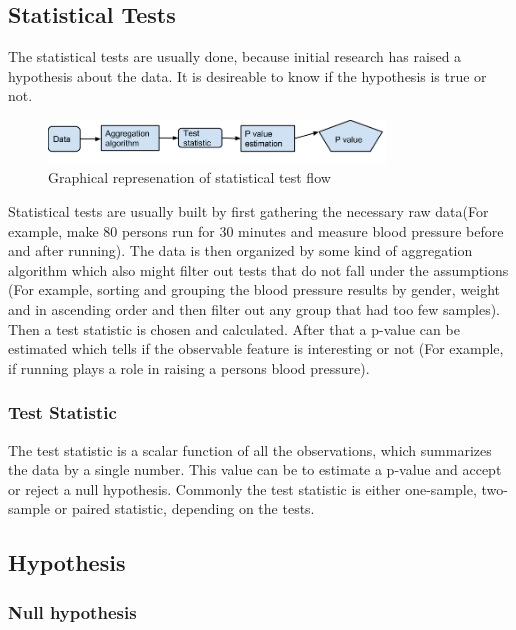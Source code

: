 \documentclass[12pt]{article}
\begin{document}
\subsection{Statistical Tests}

The statistical tests are usually done, because initial research has raised a hypothesis about the data. It is desireable to know if the hypothesis is true or not.

\begin{figure}[!ht]
  \centering
  \includegraphics[width=0.8\textwidth]{statisticalTestFlow}
  \caption{Graphical represenation of statistical test flow}
  \label{fig:statisticalTestFlow}
\end{figure}

Statistical tests are usually built by first gathering the necessary raw data(For example, make 80 persons run for 30 minutes and measure blood pressure before and after running). The data is then organized by some kind of aggregation algorithm which also might filter out tests that do not fall under the assumptions (For example, sorting and grouping the blood pressure results by gender, weight and in ascending order and then filter out any group that had too few samples). Then a test statistic is chosen and calculated. After that a p-value can be estimated which tells if the observable feature is interesting or not (For example, if running plays a role in raising a persons blood pressure).

\subsubsection{Test Statistic}

The test statistic is a scalar function of all the observations, which summarizes the data by a single number. This value can be to estimate a p-value and accept or reject a null hypothesis. Commonly the test statistic is either one-sample, two-sample or paired statistic, depending on the tests.

\subsection{Hypothesis}

\subsubsection{Null hypothesis}
\end{document}
